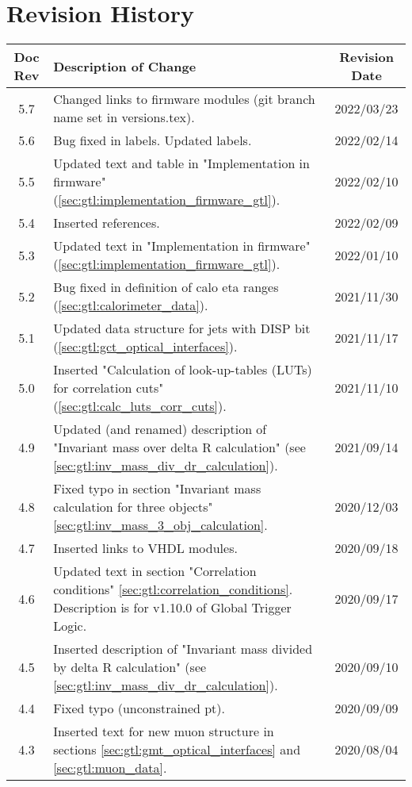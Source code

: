 \section*{Revision History}
\label{sec:revision_history}

\begin{longtable}{|c|p{}|c|}
\hline
Doc Rev & Description of Change & Revision Date\\
\hline
\hline
\endhead
5.7 & Changed links to firmware modules (git branch name set in versions.tex). & 2022/03/23\\
5.6 & Bug fixed in labels. Updated labels. & 2022/02/14\\
5.5 & Updated text and table in "Implementation in firmware" (\ref{sec:gtl:implementation_firmware_gtl}). & 2022/02/10\\
5.4 & Inserted references. & 2022/02/09\\
5.3 & Updated text in "Implementation in firmware" (\ref{sec:gtl:implementation_firmware_gtl}). & 2022/01/10\\
5.2 & Bug fixed in definition of calo eta ranges (\ref{sec:gtl:calorimeter_data}). & 2021/11/30\\
5.1 & Updated data structure for jets with DISP bit (\ref{sec:gtl:gct_optical_interfaces}). & 2021/11/17\\
5.0 & Inserted "Calculation of look-up-tables (LUTs) for correlation cuts" (\ref{sec:gtl:calc_luts_corr_cuts}). & 2021/11/10\\
4.9 & Updated (and renamed) description of "Invariant mass over delta R calculation" (see \ref{sec:gtl:inv_mass_div_dr_calculation}). & 2021/09/14\\
4.8 & Fixed typo in section "Invariant mass calculation for three objects" \ref{sec:gtl:inv_mass_3_obj_calculation}. & 2020/12/03\\
4.7 & Inserted links to VHDL modules. & 2020/09/18\\
4.6 & Updated text in section "Correlation conditions" \ref{sec:gtl:correlation_conditions}. Description is for v1.10.0 of Global Trigger Logic. & 2020/09/17\\
4.5 & Inserted description of "Invariant mass divided by delta R calculation" (see \ref{sec:gtl:inv_mass_div_dr_calculation}). & 2020/09/10\\
4.4 & Fixed typo (unconstrained pt). & 2020/09/09\\
4.3 & Inserted text for new muon structure in sections \ref{sec:gtl:gmt_optical_interfaces} and \ref{sec:gtl:muon_data}. & 2020/08/04\\

\end{longtable}
